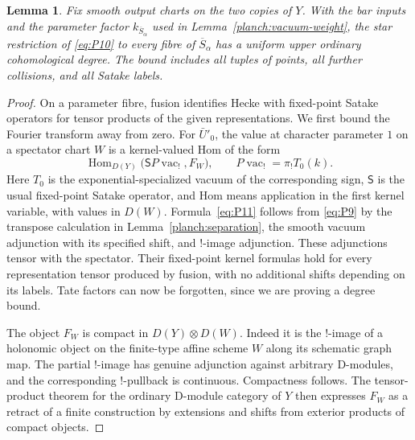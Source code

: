 \documentclass[11pt]{article}
\numberwithin{equation}{section}
\newtheorem{lemma}[theorem]{Lemma}
\theoremstyle{definition}
\theoremstyle{remark}
\begin{document}
\begin{lemma}
\label{planch:satake-degree}
Fix smooth output charts on the two copies of $Y$.  With the bar inputs
and the parameter factor $k_{\overline S_\alpha}$ used in
Lemma~\ref{planch:vacuum-weight}, the star restriction of
\eqref{eq:P10} to every fibre of $\overline S_\alpha$ has a uniform
upper ordinary cohomological degree.  The bound includes all tuples
of points, all further collisions, and all Satake labels.
\end{lemma}

\begin{proof}
On a parameter fibre, fusion identifies Hecke with fixed-point
Satake operators for tensor products of the given representations.
We first bound the Fourier transform away from zero.  For
$\bar U'_0$, the value at character parameter $1$ on a spectator
chart $W$ is a kernel-valued Hom of the form
\begin{equation}
 \operatorname{Hom}_{D(Y)}
       \bigl(\mathsf S P\operatorname{vac}_!,F_W\bigr),
 \qquad P\operatorname{vac}_!=\pi_!T_0(k).
 \label{eq:P11}
\end{equation}
Here $T_0$ is the exponential-specialized vacuum of the corresponding
sign, $\mathsf S$ is the usual fixed-point Satake operator, and Hom
means application in the first kernel variable, with values in
$D(W)$.  Formula~\eqref{eq:P11} follows from \eqref{eq:P9} by the
transpose calculation in Lemma~\ref{planch:separation}, the smooth
vacuum adjunction with its specified shift, and $!$-image adjunction.
These adjunctions tensor with the spectator.  Their fixed-point
kernel formulas hold for every representation tensor produced by
fusion, with no additional shifts depending on its labels.  Tate
factors can now be forgotten, since we are proving a degree bound.

The object $F_W$ is compact in $D(Y)\otimes D(W)$.  Indeed it is the
$!$-image of a holonomic object on the finite-type affine scheme $W$
along its schematic graph map.  The partial $!$-image has genuine
adjunction against arbitrary D-modules, and the corresponding
$!$-pullback is continuous.  Compactness follows.  The tensor-product
theorem for the ordinary D-module category of $Y$ then expresses
$F_W$ as a retract of a finite construction by extensions and shifts
from exterior products of compact objects.


\end{proof}
\end{document}
